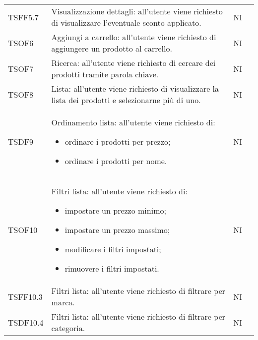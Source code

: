 \begin{center}
\begin{longtable}[!h]{p{50px} p{245px} p{75px} p{50px}}
        TSFF5.7                          & Visualizzazione dettagli: all'utente viene richiesto di visualizzare l'eventuale sconto applicato.                       & NI             \\
        TSOF6                            & Aggiungi a carrello: all'utente viene richiesto di aggiungere un prodotto al carrello.                                                                              & NI             \\
        TSOF7                            & Ricerca: all'utente viene richiesto di cercare dei prodotti tramite parola chiave.                                                                                  & NI             \\
        TSOF8                            & Lista: all'utente viene richiesto di visualizzare la lista dei prodotti e selezionarne pi\`u di uno.                                                                & NI             \\
        TSDF9                            & Ordinamento lista: all'utente viene richiesto di: \begin{itemize} \item ordinare i prodotti per prezzo; \item ordinare i prodotti per nome. \end{itemize}                                                                                        & NI             \\
        TSOF10                           & Filtri lista: all'utente viene richiesto di: \begin{itemize} \item impostare un prezzo minimo; \item impostare un prezzo massimo; \item modificare i filtri impostati; \item rimuovere i filtri impostati. \end{itemize}                                                                                               & NI             \\
        TSFF10.3                         & Filtri lista: all'utente viene richiesto di filtrare per marca.                                                                                              & NI             \\
        TSDF10.4                         & Filtri lista: all'utente viene richiesto di filtrare per categoria.                                                                                             & NI             \\

\end{longtable}
\end{center}
